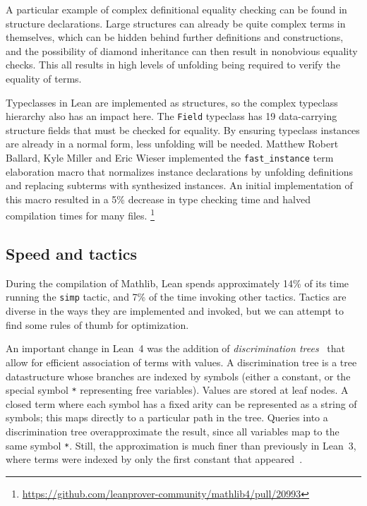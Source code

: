 \documentclass[runningheads]{llncs}
\def\mathlib{Mathlib\xspace}
\newcommand{\lean}[1]{\texttt{#1}}
\begin{document}
A particular example of complex definitional equality checking can be found in structure declarations.
Large structures can already be quite complex terms in themselves,
which can be hidden behind further definitions and constructions,
and the possibility of diamond inheritance can then result in nonobvious equality checks.
This all results in high levels of unfolding being required to verify the equality of terms.

Typeclasses in Lean are implemented as structures, so the complex typeclass hierarchy also has an impact here.
The \lean{Field} typeclass has 19 data-carrying structure fields that must be checked for equality.
By ensuring typeclass instances are already in a normal form, less unfolding will be needed.
Matthew Robert Ballard, Kyle Miller and Eric Wieser implemented the \lean{fast_instance} term elaboration macro
that normalizes instance declarations by unfolding definitions and replacing subterms with synthesized instances.
An initial implementation of this macro resulted in a 5\% decrease in type checking time
and halved compilation times for many files.%
\footnote{\url{https://github.com/leanprover-community/mathlib4/pull/20993}}

\subsection{Speed and tactics}

During the compilation of \mathlib, Lean spends approximately 14\% of its time running the \lean{simp} tactic,
and 7\% of the time invoking other tactics.
Tactics are diverse in the ways they are implemented and invoked, but we can attempt to find some rules of thumb for optimization.

An important change in Lean~4 was the addition of \emph{discrimination trees}~\cite{McCuneDiscrTrees, HandbookTermIndexing} that allow for efficient association of terms with values.
A discrimination tree is a tree datastructure whose branches are indexed by symbols (either a constant, or the special symbol \lean{*} representing free variables).
Values are stored at leaf nodes.
A closed term where each symbol has a fixed arity can be represented as a string of symbols;
this maps directly to a particular path in the tree.
Queries into a discrimination tree overapproximate the result, since all variables map to the same symbol \lean{*}.
Still, the approximation is much finer than previously in Lean~3, where terms were indexed by only the first constant that appeared~\cite{Lean4}.
\end{document}
